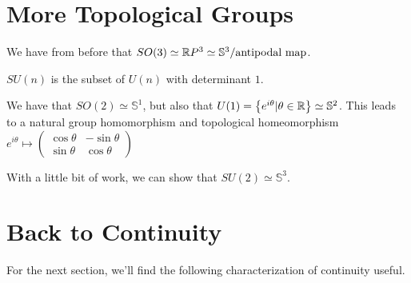 

\section*{More Topological Groups}

We have from before that $SO(3)\simeq \mathbb{R} P^3 \simeq \mathbb{S}^3/{\text{antipodal map}}$.



$SU(n)$ is the subset of $U(n)$ with determinant $1$.

We have that $SO(2)\simeq \mathbb{S}^1$, but also that $U(1) = \left\{  e^{i\theta}|\theta\in\mathbb{R}     \right\} \simeq \mathbb{S}^2$.  This leads to a natural group homomorphism and topological homeomorphism $e^{i\theta}\mapsto
 \begin{pmatrix} 
 \cos\theta & -\sin\theta\\
 \sin\theta & \cos\theta
 \end{pmatrix}$
 
 With a little bit of work, we can show that $SU(2)\simeq \mathbb{S}^3$.
 
 

\section*{Back to Continuity}

For the next section, we'll find the following characterization of continuity useful.

